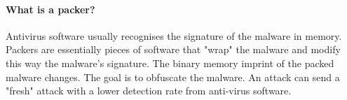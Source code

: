\paragraph{What is a packer?}
Antivirus software usually recognises the signature of the malware in memory. Packers are essentially pieces of software that "wrap" the malware and modify this way the malware's signature. The binary memory imprint of the packed malware changes. The goal is to obfuscate the malware. An attack can send a "fresh" attack with a lower detection rate from anti-virus software.